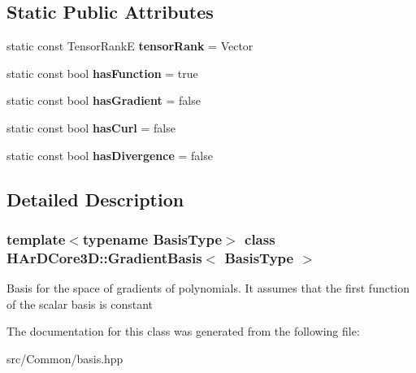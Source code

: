 \subsection*{Static Public Attributes}
\begin{DoxyCompactItemize}
\item 
\mbox{\label{classHArDCore3D_1_1GradientBasis_ae15ea33e6d492df490f202061e73a5c7}} 
static const Tensor\+RankE {\bfseries tensor\+Rank} = Vector
\item 
\mbox{\label{classHArDCore3D_1_1GradientBasis_ac70395c81f9bb7ec168fc77cb287f6b8}} 
static const bool {\bfseries has\+Function} = true
\item 
\mbox{\label{classHArDCore3D_1_1GradientBasis_a0c0ccb90014bf1b30726d5f8ac7f360d}} 
static const bool {\bfseries has\+Gradient} = false
\item 
\mbox{\label{classHArDCore3D_1_1GradientBasis_ab2338daf54d3c72ca49f0cc665d35331}} 
static const bool {\bfseries has\+Curl} = false
\item 
\mbox{\label{classHArDCore3D_1_1GradientBasis_a3be6e64c5c36d83019fdfefd249a0f3d}} 
static const bool {\bfseries has\+Divergence} = false
\end{DoxyCompactItemize}


\subsection{Detailed Description}
\subsubsection*{template$<$typename Basis\+Type$>$\newline
class H\+Ar\+D\+Core3\+D\+::\+Gradient\+Basis$<$ Basis\+Type $>$}

Basis for the space of gradients of polynomials. It assumes that the first function of the scalar basis is constant 

The documentation for this class was generated from the following file\+:\begin{DoxyCompactItemize}
\item 
src/\+Common/basis.\+hpp\end{DoxyCompactItemize}
